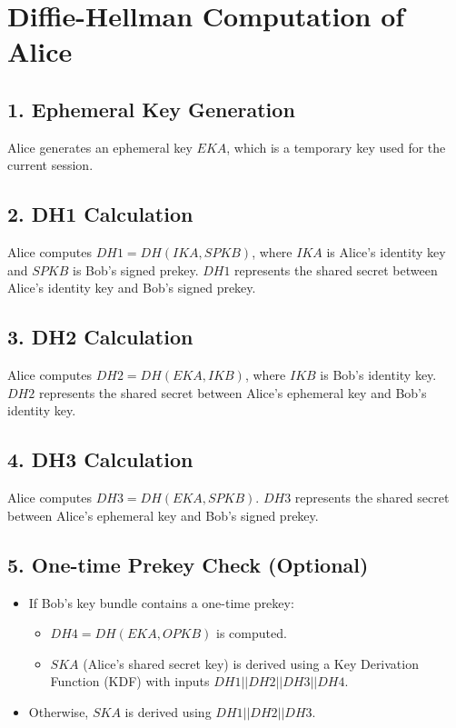 \documentclass[11pt]{article}
\begin{document}
\section{Diffie-Hellman Computation of Alice}
\subsection{1. Ephemeral Key Generation}
Alice generates an ephemeral key \( EKA \), which is a temporary key used for the current session.

\subsection{2. DH1 Calculation}
Alice computes \( DH1 = DH(IKA, SPKB) \), where \( IKA \) is Alice's identity key and \( SPKB \) is Bob's signed prekey. \( DH1 \) represents the shared secret between Alice's identity key and Bob's signed prekey.

\subsection{3. DH2 Calculation}
Alice computes \( DH2 = DH(EKA, IKB) \), where \( IKB \) is Bob's identity key. \( DH2 \) represents the shared secret between Alice's ephemeral key and Bob's identity key.

\subsection{4. DH3 Calculation}
Alice computes \( DH3 = DH(EKA, SPKB) \). \( DH3 \) represents the shared secret between Alice's ephemeral key and Bob's signed prekey.

\subsection{5. One-time Prekey Check (Optional)}
\begin{itemize}
    \item If Bob's key bundle contains a one-time prekey:
    \begin{itemize}
        \item \( DH4 = DH(EKA, OPKB) \) is computed.
        \item \( SKA \) (Alice's shared secret key) is derived using a Key Derivation Function (KDF) with inputs \( DH1 || DH2 || DH3 || DH4 \).
    \end{itemize}
    \item Otherwise, \( SKA \) is derived using \( DH1 || DH2 || DH3 \).
\end{itemize}
\end{document}
